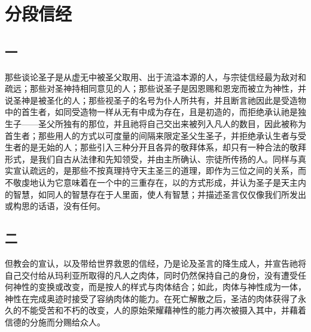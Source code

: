 
\chapter{分段信经}



\section{一}

那些谈论圣子是从虚无中被圣父取用、出于流溢本源的人，与宗徒信经最为敌对和疏远；那些对圣神持相同意见的人；那些说圣子是因恩赐和恩宠而被立为神性，并说圣神是被圣化的人；那些视圣子的名号为仆人所共有，并且断言祂因此是受造物中的首生者，如同受造物一样从无有中成为存在，且是初造的，而拒绝承认祂是独生子——圣父所独有的那位，并且祂将自己交出来被列入凡人的数目，因此被称为首生者；那些用人的方式以可度量的间隔来限定圣父生圣子，并拒绝承认生者与受生者的是无始的人；那些引入三种分开且各异的敬拜体系，却只有一种合法的敬拜形式，是我们自古从法律和先知领受，并由主所确认、宗徒所传扬的人。同样与真实宣认疏远的，是那些不按真理持守天主圣三的道理，即作为三位之间的关系，而不敬虔地认为它意味着在一个中的三重存在，以的方式形成，并认为圣子是天主内的智慧，如同人的智慧存在于人里面，使人有智慧；并描述圣言仅仅像我们所发出或构思的话语，没有任何。\par


\section{二}

但教会的宣认，以及带给世界救恩的信经，乃是论及圣言的降生成人，并宣告祂将自己交付给从玛利亚所取得的凡人之肉体，同时仍然保持自己的身份，没有遭受任何神性的变换或改变，而是按人的样式与肉体结合；如此，肉体与神性成为一体，神性在完成奥迹时接受了容纳肉体的能力。在死亡解散之后，圣洁的肉体获得了永久的不能受苦和不朽的改变，人的原始荣耀藉神性的能力再次被摄入其中，并藉着信德的分施而分赐给众人。\par

